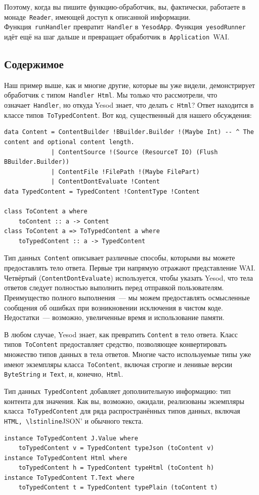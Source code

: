 Поэтому, когда вы пишите функцию-обработчик, вы, фактически, работаете в
монаде~\lstinline'Reader', имеющей доступ к описанной информации.
Функция~\lstinline'runHandler' превратит~\lstinline'Handler'
в~\lstinline'YesodApp'. Функция~\lstinline'yesodRunner' идёт ещё на шаг дальше
и превращает обработчик в~\lstinline'Application'~WAI.

\subsection{Содержимое}
Наш пример выше, как и многие другие, которые вы уже видели, демонстрирует
обработчик с типом~\lstinline'Handler Html'. Мы только что рассмотрели, что
означает~\lstinline'Handler', но откуда Yesod знает, что делать
с~\lstinline'Html'? Ответ находится в классе типов~\lstinline'ToTypedContent'.
Вот код, существенный для нашего обсуждения:
\begin{lstlisting}
data Content = ContentBuilder !BBuilder.Builder !(Maybe Int) -- ^ The content and optional content length.
             | ContentSource !(Source (ResourceT IO) (Flush BBuilder.Builder))
             | ContentFile !FilePath !(Maybe FilePart)
             | ContentDontEvaluate !Content
data TypedContent = TypedContent !ContentType !Content

class ToContent a where
    toContent :: a -> Content
class ToContent a => ToTypedContent a where
    toTypedContent :: a -> TypedContent
\end{lstlisting}

Тип данных~\lstinline'Content' описывает различные способы, которыми вы
можете предоставлять тело ответа. Первые три напрямую отражают представление
WAI. Четвёртый (\lstinline'ContentDontEvaluate') используется, чтобы указать
Yesod, что тела ответов следует полностью выполнить перед отправкой
пользователям. Преимущество полного выполнения~--- мы можем предоставлять
осмысленные сообщения об ошибках при возникновении исключения в чистом коде.
Недостатки~--- возможно, увеличенные время и использование памяти.

В любом случае, Yesod знает, как превратить \lstinline'Content' в тело ответа.
Класс типов~\lstinline'ToContent' предоставляет средство, позволяющее
конвертировать множество типов данных в тела ответов. Многие часто используемые
типы уже имеют экземпляры класса~\lstinline'ToContent', включая строгие и
ленивые версии \lstinline'ByteString' и~\lstinline'Text', и,
конечно,~\lstinline'Html'.

Тип данных~\lstinline'TypedContent' добавляет дополнительную информацию: тип
контента для значения. Как вы, возможно, ожидали, реализованы экземпляры
класса~\lstinline'ToTypedContent' для ряда распространённых типов данных,
включая \lstinline'HTML, \lstinline'JSON' и обычного текста.
\begin{lstlisting}
instance ToTypedContent J.Value where
    toTypedContent v = TypedContent typeJson (toContent v)
instance ToTypedContent Html where
    toTypedContent h = TypedContent typeHtml (toContent h)
instance ToTypedContent T.Text where
    toTypedContent t = TypedContent typePlain (toContent t)
\end{lstlisting}

